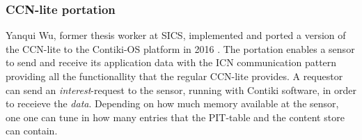 \subsubsection{CCN-lite portation}
Yanqui Wu, former thesis worker at SICS, implemented and ported a version of the CCN-lite \cite{CCN-LITE} to the Contiki-OS platform in 2016 \cite{yanqui}. The portation enables a sensor to send and receive its application data with the ICN communication pattern providing all the functionallity that the regular CCN-lite provides. A requestor can send an \textit{interest}-request to the sensor, running with Contiki software, in order to receieve the \textit{data}. Depending on how much memory available at the sensor, one one can tune in how many entries that the PIT-table and the content store can contain.

